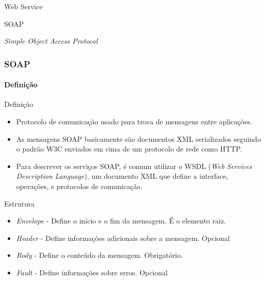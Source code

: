 \documentclass[
	9pt, %
	t, %
]{beamer}
\begin{document}
\begin{frame}
	\begin{center}

		\bigskip\bigskip\bigskip\bigskip %
		{\Large Web Service}

		\bigskip\bigskip %
		{\Huge SOAP}

		\smallskip
		{\small \textit{Simple Object Access Protocol}}
	\end{center}

\end{frame}

\begin{frame}
	\frametitle{SOAP}
	\framesubtitle{Definição}

	\begin{block}{Definição}
		\begin{itemize}
			\item Protocolo de comunicação usado para troca de mensagens entre aplicações.
			\item As mensagens SOAP basicamente são \alert{documentos XML} serializados seguindo
			      o padrão W3C enviados em cima de um protocolo de rede como HTTP.
			\item Para descrever os serviços SOAP, é comum utilizar o WSDL (\textit{Web Services
				      Description Language}), um documento XML que define a interface, operações, e
			      protocolos de comunicação.
		\end{itemize}
	\end{block}

	\begin{exampleblock}{Estrutura}
		\begin{itemize}
			\item \textit{Envelope} - Define o início e o fim da mensagem. É o elemento raiz.
			\item \textit{Header} - Define informações adicionais sobre a mensagem. Opcional
			\item \textit{Body} - Define o conteúdo da mensagem. Obrigatório.
			\item \textit{Fault} - Define informações sobre erros. Opcional
		\end{itemize}
	\end{exampleblock}

\end{frame}
\end{document}
